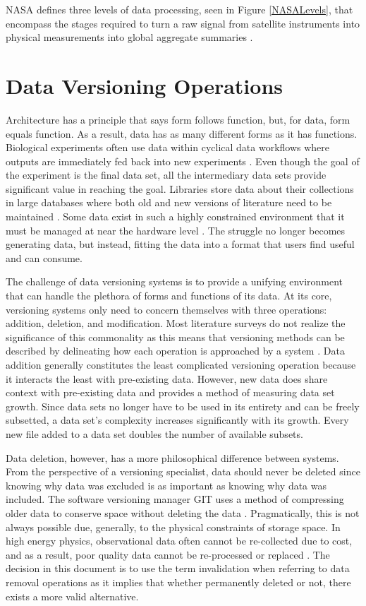 NASA defines three levels of data processing, seen in Figure \ref{NASALevels}, that encompass the stages required to turn a raw signal from satellite instruments into physical measurements into global aggregate summaries \cite{Barkstrom2003}.

\section{Data Versioning Operations}

Architecture has a principle that says form follows function, but, for data, form equals function.
As a result, data has as many different forms as it has functions.
Biological experiments often use data within cyclical data workflows where outputs are immediately fed back into new experiments \cite{Tagger2005}.
Even though the goal of the experiment is the final data set, all the intermediary data sets provide significant value in reaching the goal.
Libraries store data about their collections in large databases where both old and new versions of literature need to be maintained \cite{Wiil:2000:RDH:338407.338517}.
Some data exist in such a highly constrained environment that it must be managed at near the hardware level \cite{Flouris04clotho:transparent}.
The struggle no longer becomes generating data, but instead, fitting the data into a format that users find useful and can consume.

The challenge of data versioning systems is to provide a unifying environment that can handle the plethora of forms and functions of its data.
At its core, versioning systems only need to concern themselves with three operations: addition, deletion, and modification.
Most literature surveys do not realize the significance of this commonality as this means that versioning methods can be described by delineating how each operation is approached by a system \cite{Tagger2005} \cite{rohtua}.
Data addition generally constitutes the least complicated versioning operation because it interacts the least with pre-existing data.
However, new data does share context with pre-existing data and provides a method of measuring data set growth.
Since data sets no longer have to be used in its entirety and can be freely subsetted, a data set's complexity increases significantly with its growth.
Every new file added to a data set doubles the number of available subsets.

Data deletion, however, has a more philosophical difference between systems.
From the perspective of a versioning specialist, data should never be deleted since knowing why data was excluded is as important as knowing why data was included.
The software versioning manager GIT uses a method of compressing older data to conserve space without deleting the data \cite{Chacon:2009:PG:1618548}.
Pragmatically, this is not always possible due, generally, to the physical constraints of storage space.
In high energy physics, observational data often cannot be re-collected due to cost, and as a result, poor quality data cannot be re-processed or replaced \cite{Cavanaugh2002}.
The decision in this document is to use the term invalidation when referring to data removal operations as it implies that whether permanently deleted or not, there exists a more valid alternative.

